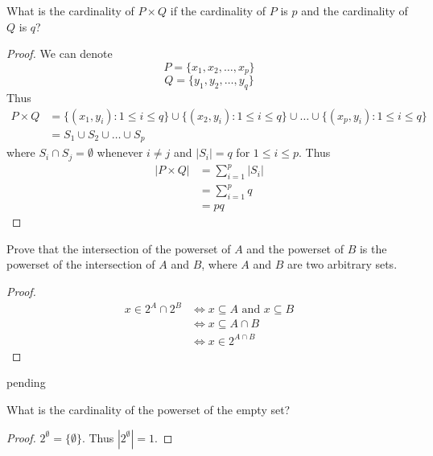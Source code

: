 \begin{exercise} \label{0.16}
	What is the cardinality of $P \times Q$ if the cardinality of $P$ is $p$ and the cardinality of $Q$ is $q$?
	
	\begin{proof}
	    We can denote
	    $$ P = \{ x_1, x_2, \ldots, x_p \} $$
	    $$ Q = \{ y_1, y_2, \ldots, y_q \} $$
	    Thus
	    \begin{align*}
	        P \times Q &= \{ (x_1,y_i): 1 \leq i \leq q \} \cup \{ (x_2,y_i): 1 \leq i \leq q \} \cup \ldots \cup \{ (x_p,y_i): 1 \leq i \leq q \} \\
	        &= S_1 \cup S_2 \cup \ldots \cup S_p
	    \end{align*}
	    where $S_i \cap S_j = \emptyset$ whenever $i \neq j$ and $\vert S_i \vert = q$ for $1 \leq i \leq p$. Thus 
	    \begin{align*}
	        \vert P \times Q \vert &= \sum_{i=1}^{p} \vert S_i \vert \\
	        &= \sum_{i=1}^{p} q \\
	        &= pq
	    \end{align*}
	\end{proof}
\end{exercise}

\begin{exercise} \label{0.17}
	Prove that the intersection of the powerset of $A$ and the powerset of $B$ is the powerset of the intersection of $A$ and $B$, where $A$ and $B$ are two arbitrary sets.
	
	\begin{proof}
	    \begin{align*}
	        x \in 2^{A} \cap 2^{B} &\iff x \subseteq A \text{ and } x \subseteq B \\
	        &\iff x \subseteq A \cap B \\
	        &\iff x \in 2^{A \cap B}
	    \end{align*}    
	\end{proof}
\end{exercise}

\begin{exercise} \label{0.18}
	pending
\end{exercise}

\begin{exercise} \label{0.19}
	What is the cardinality of the powerset of the empty set?
	
	\begin{proof}
	    $2^\emptyset = \{ \emptyset \}$. Thus $\left| 2^\emptyset \right| = 1$.
	\end{proof}
\end{exercise}

